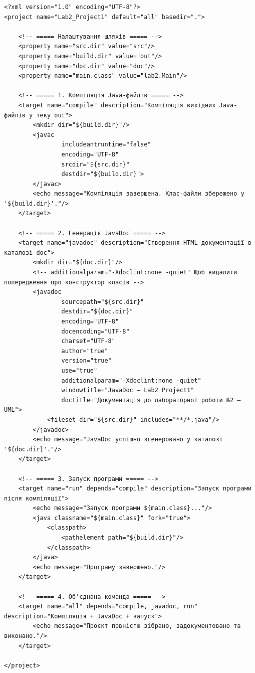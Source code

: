 \documentclass[12pt,a4paper]{article}
\begin{document}
    \begin{verbatim}
<?xml version="1.0" encoding="UTF-8"?>
<project name="Lab2_Project1" default="all" basedir=".">

    <!-- ===== Налаштування шляхів ===== -->
    <property name="src.dir" value="src"/>
    <property name="build.dir" value="out"/>
    <property name="doc.dir" value="doc"/>
    <property name="main.class" value="lab2.Main"/>

    <!-- ===== 1. Компіляція Java-файлів ===== -->
    <target name="compile" description="Компіляція вихідних Java-файлів у теку out">
        <mkdir dir="${build.dir}"/>
        <javac
                includeantruntime="false"
                encoding="UTF-8"
                srcdir="${src.dir}"
                destdir="${build.dir}">
        </javac>
        <echo message="Компіляція завершена. Клас-файли збережено у '${build.dir}'."/>
    </target>

    <!-- ===== 2. Генерація JavaDoc ===== -->
    <target name="javadoc" description="Створення HTML-документації в каталозі doc">
        <mkdir dir="${doc.dir}"/>
        <!-- additionalparam="-Xdoclint:none -quiet" Щоб видалити попередження про конструктор класів -->
        <javadoc
                sourcepath="${src.dir}"
                destdir="${doc.dir}"
                encoding="UTF-8"
                docencoding="UTF-8"
                charset="UTF-8"
                author="true"
                version="true"
                use="true"
                additionalparam="-Xdoclint:none -quiet"
                windowtitle="JavaDoc – Lab2 Project1"
                doctitle="Документація до лабораторної роботи №2 – UML">
            <fileset dir="${src.dir}" includes="**/*.java"/>
        </javadoc>
        <echo message="JavaDoc успішно згенеровано у каталозі '${doc.dir}'."/>
    </target>

    <!-- ===== 3. Запуск програми ===== -->
    <target name="run" depends="compile" description="Запуск програми після компіляції">
        <echo message="Запуск програми ${main.class}..."/>
        <java classname="${main.class}" fork="true">
            <classpath>
                <pathelement path="${build.dir}"/>
            </classpath>
        </java>
        <echo message="Програму завершено."/>
    </target>

    <!-- ===== 4. Об'єднана команда ===== -->
    <target name="all" depends="compile, javadoc, run" description="Компіляція + JavaDoc + запуск">
        <echo message="Проєкт повністю зібрано, задокументовано та виконано."/>
    </target>

</project>
    \end{verbatim}
\end{document}
